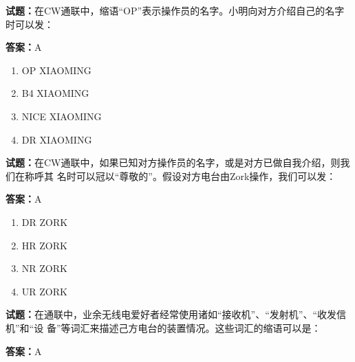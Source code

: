 \documentclass{ctexbook}
\begin{document}




\vspace{1em}

\textbf{试题：}在CW通联中，缩语“OP”表示操作员的名字。小明向对方介绍自己的名字时可以发： 

\textbf{答案：}A 

\begin{enumerate}[leftmargin=3em]
  \item OP XIAOMING 

  \item B4 XIAOMING 

  \item NICE XIAOMING 

  \item DR XIAOMING 

\end{enumerate}





\vspace{1em}

\textbf{试题：}在CW通联中，如果已知对方操作员的名字，或是对方已做自我介绍，则我们在称呼其
名时可以冠以“尊敬的”。假设对方电台由Zork操作，我们可以发： 

\textbf{答案：}A 

\begin{enumerate}[leftmargin=3em]
  \item DR ZORK 

  \item HR ZORK 

  \item NR ZORK 

  \item UR ZORK 

\end{enumerate}





\vspace{1em}

\textbf{试题：}在通联中，业余无线电爱好者经常使用诸如“接收机”、“发射机”、“收发信机”和“设
备”等词汇来描述己方电台的装置情况。这些词汇的缩语可以是： 

\textbf{答案：}A 
\end{document}
